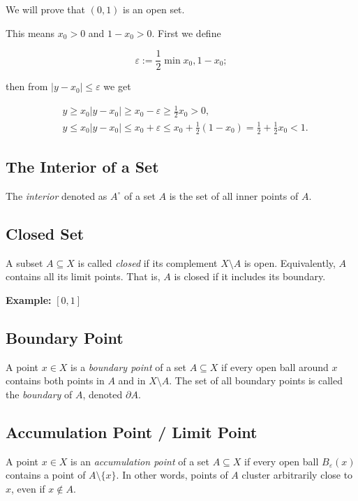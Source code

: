 We will prove that  \((0,1)\) is an open set. 

This means \(x_0 > 0\) and \(1 - x_0 > 0\). First we define 

\[
	\varepsilon := \frac{1}{2} \min {x_0, 1 - x_0};
\]

then from \(|y - x_0| \le \varepsilon\) we get 

\begin{align*}
	&y \ge x_0 |y - x_0 | \ge x_0 - \varepsilon \ge \frac{1}{2}x_0 > 0, \\ 
	&y \le x_0 |y - x_0 | \le x_0 + \varepsilon \le x_0 + \frac{1}{2}(1 - x_0) = \frac{1}{2} + \frac{1}{2}x_0 < 1.
\end{align*}

\QED 

\subsection{The Interior of a Set} 

The \emph{interior} denoted as \(A^{\circ}\) of a set \(A\) is the set of all inner points of \(A\). 

\subsection{Closed Set} 
	      
A subset \( A \subseteq X \) is called \emph{closed} if its complement \( X \setminus A \) is open. Equivalently, \(A\) contains all its limit points. 
That is, \(A\) is closed if it includes its boundary.

\textbf{Example:} \([0,1]\)

\subsection{Boundary Point}
	      
A point \( x \in X \) is a \emph{boundary point} of a set \( A \subseteq X \) if every open ball around \(x\) contains both points in \(A\) 
and in \( X \setminus A \). The set of all boundary points is called the \emph{boundary} of \(A\), denoted \( \partial A \).

\subsection{Accumulation Point / Limit Point}

A point \( x \in X \) is an \emph{accumulation point} of a set \( A \subseteq X \) if every open ball \( B_\varepsilon(x) \) contains a 
point of \( A \setminus \{x\} \). In other words, points of \(A\) cluster arbitrarily close to 
\(x\), even if \( x \notin A \).

